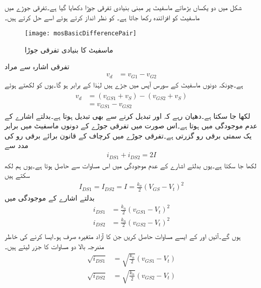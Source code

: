  
شکل  میں دو یکساں بڑھاتے ماسفیٹ پر مبنی بنیادی تفرقی جوڑا دکھایا گیا ہے۔تفرقی جوڑے میں ماسفیٹ کو افزائندہ رکھا جاتا ہے۔ کو نظر انداز کرتے ہوئے اسے حل کرتے ہیں۔
\begin{figure}
\centering
\texttt{[image: mosBasicDifferencePair]}
\caption{ماسفیٹ کا بنیادی تفرقی جوڑا}
\label{شکل_تفرقی_ماسفیٹ_بنیادی_تفرقی_جوڑا}
\end{figure}
تفرقی اشارہ  سے مراد
\begin{align*}
v_d&=v_{G1}-v_{G2}
\end{align*}
ہے۔چونکہ دونوں ماسفیٹ کے سورس  آپس میں جڑے ہیں لہٰذا  کے برابر ہو گا۔یوں  کو  لکھتے ہوئے
\begin{gather}
\begin{aligned}\label{مساوات_تفرقی_اشارے_کی_دوسری_شکل}
v_d&=\left(v_{GS1}+v_S \right)-\left(v_{GS2}+v_S \right)\\
&=v_{GS1}-v_{GS2}
\end{aligned}
\end{gather}
لکھا جا سکتا ہے۔دھیان رہے کہ  اور  تبدیل کرنے سے  بھی تبدیل ہوتا ہے۔بدلتے اشارے کے عدم موجودگی میں  ہوتا ہے۔اس صورت میں تفرقی جوڑے کے دونوں ماسفیٹ میں برابر یک سمتی برقی رو گزرتی ہے۔تفرقی جوڑے میں کرچاف کے قانون برائے برقی رو کی مدد سے
\begin{align}\label{مساوات_تفرقی_دونوں_برقی_رو_کا_مجموعی_قطعی_ہے}
i_{DS1}+i_{DS2}=2I
\end{align}
لکھا جا سکتا ہے۔یوں بدلتے اشارے کے عدم موجودگی  میں اس مساوات سے  حاصل ہوتا ہے۔یوں ہم لکھ سکتے ہیں
\begin{align}\label{مساوات_تفرقی_یکسمتی_برابر_برقی_رو_کی_مساوات}
I_{DS1}=I_{DS2}=I=\frac{k_n}{2} \left(V_{GS}-V_t \right)^2
\end{align}
بدلتے اشارے کے موجودگی میں
\begin{align*}
i_{DS1}&=\frac{k_n}{2}\left(v_{GS1}-V_t \right)^2\\
i_{DS2}&=\frac{k_n}{2}\left(v_{GS2}-V_t \right)^2\\
\end{align*}
ہوں گے۔آئیں  اور  کے ایسے مساوات حاصل کریں جن کا آزاد متغیرہ صرف  ہو۔ایسا کرنے کی خاطر مندرجہ بالا دو مساوات کا  جزر    لیتے ہیں۔
 \begin{align*}
\sqrt{i_{DS1}}&=\sqrt{\frac{k_n}{2}}\left(v_{GS1}-V_t \right)\\
\sqrt{i_{DS2}}&=\sqrt{\frac{k_n}{2}}\left(v_{GS2}-V_t \right)\\
\end{align*}
